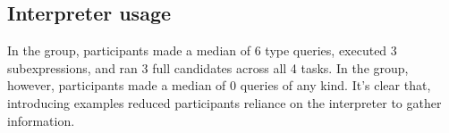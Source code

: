 \subsection{Interpreter usage}
In the \noexamples group, participants made a median of 6 type queries,
executed 3 subexpressions, and ran 3 full candidates across all 4 tasks.
%
In the \examples group, however, participants made a median of 0 queries of any kind.
%
It's clear that, introducing examples reduced participants reliance on the
interpreter to gather information.

